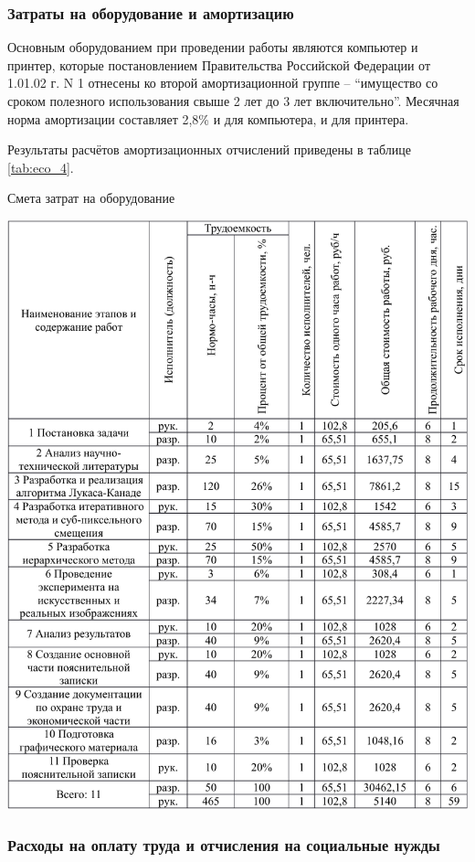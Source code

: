\subsubsection{Затраты на оборудование и амортизацию}

Основным оборудованием при проведении работы являются компьютер и принтер, которые постановлением Правительства Российской Федерации от 1.01.02 г. N 1 отнесены ко второй амортизационной группе – ``имущество со сроком полезного использования свыше 2 лет до 3 лет включительно''. Месячная норма амортизации составляет 2,8\% и для компьютера, и для принтера.

Результаты расчётов амортизационных отчислений приведены в таблице \ref{tab:eco_4}.

\begin{table}[!ht]
\caption{Смета затрат на оборудование}
\centering
\includegraphics[page=4, width=1\linewidth]{econom_table.pdf}
\label{tab:eco_4}
\end{table}

\subsubsection{Расходы на оплату труда и отчисления на социальные нужды}

